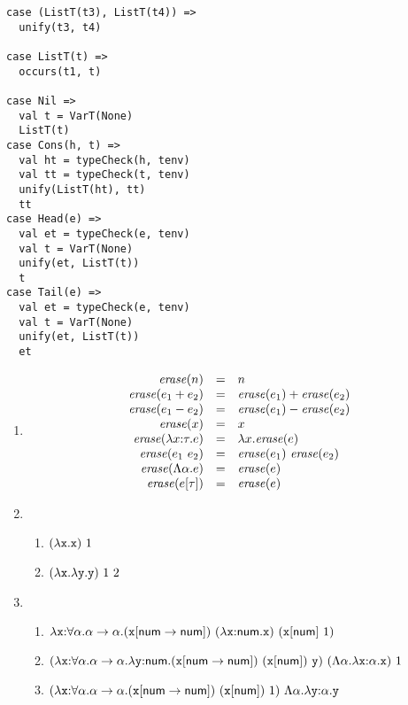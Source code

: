 \textbf{}
\vspace{-1em}
\begin{verbatim}
case (ListT(t3), ListT(t4)) =>
  unify(t3, t4)

case ListT(t) =>
  occurs(t1, t)

case Nil =>
  val t = VarT(None)
  ListT(t)
case Cons(h, t) =>
  val ht = typeCheck(h, tenv)
  val tt = typeCheck(t, tenv)
  unify(ListT(ht), tt)
  tt
case Head(e) =>
  val et = typeCheck(e, tenv)
  val t = VarT(None)
  unify(et, ListT(t))
  t
case Tail(e) =>
  val et = typeCheck(e, tenv)
  val t = VarT(None)
  unify(et, ListT(t))
  et
\end{verbatim}

\textbf{}
\begin{enumerate}
  \item
    \[
      \begin{array}{rcl}
        \mbox{\emph{erase}}(n)&=&n \\
        \mbox{\emph{erase}}(e_1+e_2)&=&\mbox{\emph{erase}}(e_1)+\mbox{\emph{erase}}(e_2) \\
        \mbox{\emph{erase}}(e_1-e_2)&=&\mbox{\emph{erase}}(e_1)-\mbox{\emph{erase}}(e_2) \\
        \mbox{\emph{erase}}(x)&=&x \\
        \mbox{\emph{erase}}(\lambda x{:}\tau.e)&=&\lambda x.\mbox{\emph{erase}}(e) \\
        \mbox{\emph{erase}}(e_1\ e_2)&=&\mbox{\emph{erase}}(e_1)\ \mbox{\emph{erase}}(e_2) \\
        \mbox{\emph{erase}}(\Lambda\alpha.e)&=&\mbox{\emph{erase}}(e) \\
        \mbox{\emph{erase}}(e[\tau])&=&\mbox{\emph{erase}}(e) \\
      \end{array}
    \]
  \item
    \begin{enumerate}
      \item $(\lambda\texttt{x}.\texttt{x})\ 1$
      \item $(\lambda\texttt{x}.\lambda\texttt{y}.\texttt{y})\ 1\ 2$
    \end{enumerate}
  \item
    \begin{enumerate}
      \item
        $\lambda\texttt{x}{:}\forall\alpha.\alpha\rightarrow\alpha.(\texttt{x}[\textsf{num}\rightarrow\textsf{num}])\ (\lambda\texttt{x}{:}\textsf{num}.\texttt{x})\ (\texttt{x}[\textsf{num}]\ 1)$
      \item
        $
          (\lambda\texttt{x}{:}\forall\alpha.\alpha\rightarrow\alpha.\lambda\texttt{y}{:}\textsf{num}.(\texttt{x}[\textsf{num}\rightarrow\textsf{num}])\ (\texttt{x}[\textsf{num}])\ \texttt{y})\ (\Lambda\alpha.\lambda\texttt{x}{:}\alpha.\texttt{x})
        \ 1$
      \item
        $(\lambda\texttt{x}{:}\forall\alpha.\alpha\rightarrow\alpha.(\texttt{x}[\textsf{num}\rightarrow\textsf{num}])\ (\texttt{x}[\textsf{num}])\ 1)\ \Lambda\alpha.\lambda\texttt{y}{:}\alpha.\texttt{y}$
    \end{enumerate}
\end{enumerate}

